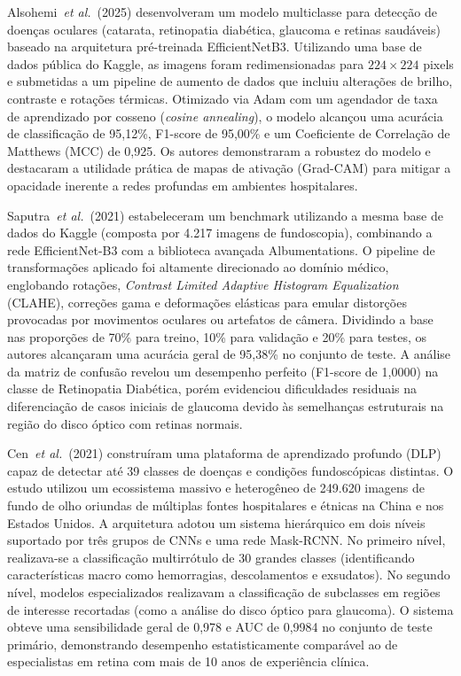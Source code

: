 \documentclass[12pt]{article}
\begin{document}
Alsohemi~\textit{et al.}~(2025)\cite{alsohemi:2025} desenvolveram um modelo multiclasse para detecção de doenças oculares (catarata, retinopatia diabética, glaucoma e retinas saudáveis) baseado na arquitetura pré-treinada EfficientNetB3. Utilizando uma base de dados pública do Kaggle, as imagens foram redimensionadas para $224\times224$ pixels e submetidas a um pipeline de aumento de dados que incluiu alterações de brilho, contraste e rotações térmicas. Otimizado via Adam com um agendador de taxa de aprendizado por cosseno (\textit{cosine annealing}), o modelo alcançou uma acurácia de classificação de 95,12\%, F1-score de 95,00\% e um Coeficiente de Correlação de Matthews (MCC) de 0,925. Os autores demonstraram a robustez do modelo e destacaram a utilidade prática de mapas de ativação (Grad-CAM) para mitigar a opacidade inerente a redes profundas em ambientes hospitalares.

Saputra~\textit{et al.}~(2021)\cite{saputra:2026} estabeleceram um benchmark utilizando a mesma base de dados do Kaggle (composta por 4.217 imagens de fundoscopia), combinando a rede EfficientNet-B3 com a biblioteca avançada Albumentations. O pipeline de transformações aplicado foi altamente direcionado ao domínio médico, englobando rotações, \textit{Contrast Limited Adaptive Histogram Equalization} (CLAHE), correções gama e deformações elásticas para emular distorções provocadas por movimentos oculares ou artefatos de câmera. Dividindo a base nas proporções de 70\% para treino, 10\% para validação e 20\% para testes, os autores alcançaram uma acurácia geral de 95,38\% no conjunto de teste. A análise da matriz de confusão revelou um desempenho perfeito (F1-score de 1,0000) na classe de Retinopatia Diabética, porém evidenciou dificuldades residuais na diferenciação de casos iniciais de glaucoma devido às semelhanças estruturais na região do disco óptico com retinas normais.

Cen~\textit{et al.}~(2021) \cite{cenautomatic} construíram uma plataforma de aprendizado profundo (DLP) capaz de detectar até 39 classes de doenças e condições fundoscópicas distintas. O estudo utilizou um ecossistema massivo e heterogêneo de 249.620 imagens de fundo de olho oriundas de múltiplas fontes hospitalares e étnicas na China e nos Estados Unidos. A arquitetura adotou um sistema hierárquico em dois níveis suportado por três grupos de CNNs e uma rede Mask-RCNN. No primeiro nível, realizava-se a classificação multirrótulo de 30 grandes classes (identificando características macro como hemorragias, descolamentos e exsudatos). No segundo nível, modelos especializados realizavam a classificação de subclasses em regiões de interesse recortadas (como a análise do disco óptico para glaucoma). O sistema obteve uma sensibilidade geral de 0,978 e AUC de 0,9984 no conjunto de teste primário, demonstrando desempenho estatisticamente comparável ao de especialistas em retina com mais de 10 anos de experiência clínica.
\end{document}
